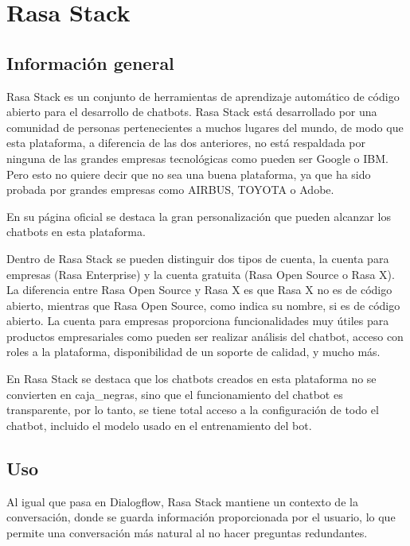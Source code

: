 \section{Rasa Stack}

\subsection*{Información general}

Rasa Stack es un conjunto de herramientas de aprendizaje automático de código abierto para el desarrollo de chatbots. Rasa Stack está desarrollado por una comunidad de personas pertenecientes a muchos lugares del mundo, de modo que esta plataforma, a diferencia de las dos anteriores, no está respaldada por ninguna de las grandes empresas tecnológicas como pueden ser Google o IBM. Pero esto no quiere decir que no sea una buena plataforma, ya que ha sido probada por grandes empresas como AIRBUS, TOYOTA o Adobe.

En su página oficial \cite{RefWorks:RefID:20-2020rasa} se destaca la gran personalización que pueden alcanzar los chatbots en esta plataforma.

Dentro de Rasa Stack se pueden distinguir dos tipos de cuenta, la cuenta para empresas (Rasa Enterprise) y la cuenta gratuita (Rasa Open Source o Rasa X). La diferencia entre Rasa Open Source y Rasa X es que Rasa X no es de código abierto, mientras que Rasa Open Source, como indica su nombre, si es de código abierto. La cuenta para empresas proporciona funcionalidades muy útiles para productos empresariales como pueden ser realizar análisis del chatbot, acceso con roles a la plataforma, disponibilidad de un soporte de calidad, y mucho más.

En Rasa Stack se destaca que los chatbots creados en esta plataforma no se convierten en \glspl{caja_negra}, sino que el funcionamiento del chatbot es transparente, por lo tanto, se tiene total acceso a la configuración de todo el chatbot, incluido el modelo usado en el entrenamiento del bot.

\subsection*{Uso}

Al igual que pasa en Dialogflow, Rasa Stack mantiene un contexto de la conversación, donde se guarda información proporcionada por el usuario, lo que permite una conversación más natural al no hacer preguntas redundantes.

